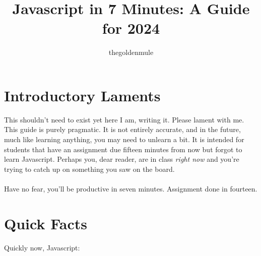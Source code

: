 \documentclass{article}
\title{Javascript in 7 Minutes: A Guide for 2024}
\author{thegoldenmule}
\begin{document}
\maketitle\tableofcontents



\newpage
\section{Introductory Laments}

This shouldn't need to exist yet here I am, writing it. Please lament with me. This guide is purely pragmatic. It is not entirely accurate, and in the future, much like learning anything, you may need to unlearn a bit. It is intended for students that have an assignment due fifteen minutes from now but forgot to learn Javascript. Perhaps you, dear reader, are in class \textit{right now} and you're trying to catch up on something you saw on the board.
\\
\\
Have no fear, you'll be productive in seven minutes. Assignment done in fourteen.

\section{Quick Facts}

Quickly now, Javascript:\\
\end{document}
